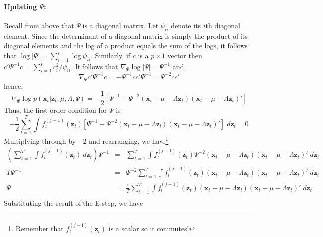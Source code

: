 \paragraph{Updating $\Psi$:} Recall from above that $\Psi$ is a diagonal matrix. Let $\psi_{ii}$ denote its $i$th diagonal element. Since the determinant of a diagonal matrix is simply the product of its diagonal elements and the log of a product equals the sum of the logs, it follows that $\log |\Psi| = \sum_{i=1}^p \log \psi_{ii}$. Similarly, if $c$ is a $p\times 1$ vector then $c' \Psi^{-1} c = \sum_{i=1}^p c_i^2/\psi_{ii}$. It follows that $\nabla_\Psi \log |\Psi| = \Psi^{-1}$ and
	$$\nabla_\Psi c' \Psi^{-1} c = - \Psi^{-1} cc' \Psi^{-1} = \Psi^{-2} cc'$$
hence, 
	$$ \nabla_\Psi \log p(\textbf{x}_t| \textbf{z}_t;\mu, \Lambda, \Psi) = -\frac{1}{2} \left[ \Psi^{-1} - \Psi^{-2}(\mathbf{x}_t - \mu -  \Lambda \textbf{z}_t)(\mathbf{x}_t - \mu -  \Lambda \textbf{z}_t)' \right]$$
Thus, the first order condition for $\Psi$ is
$$-\frac{1}{2}\sum_{t=1}^T \int f_t^{(j-1)}(\textbf{z}_t)  \left[ \Psi^{-1} - \Psi^{-2}(\mathbf{x}_t - \mu -  \Lambda \textbf{z}_t)(\mathbf{x}_t - \mu -  \Lambda \textbf{z}_t)' \right]\;d \textbf{z}_t = 0$$
Multiplying through by $-2$ and rearranging, we have\footnote{Remember that $f_t^{(j-1)}(\textbf{z}_t)$ is a scalar so it commutes!}
\begin{eqnarray*}
	\left(\sum_{t=1}^T \int f_t^{(j-1)}(\textbf{z}_t) \;d \textbf{z}_t\right) \Psi^{-1}&=& \sum_{t=1}^T \int f_t^{(j-1)}(\textbf{z}_t)\Psi^{-2}(\mathbf{x}_t - \mu -  \Lambda \textbf{z}_t)(\mathbf{x}_t - \mu -  \Lambda \textbf{z}_t)' \;d \textbf{z}_t\\
	T\Psi^{-1}&=& \Psi^{-2}\sum_{t=1}^T \int f_t^{(j-1)}(\textbf{z}_t)(\mathbf{x}_t - \mu -  \Lambda \textbf{z}_t)(\mathbf{x}_t - \mu -  \Lambda \textbf{z}_t)' \;d \textbf{z}_t\\
	\Psi &=& \frac{1}{T}\sum_{t=1}^T \int f_t^{(j-1)}(\textbf{z}_t)(\mathbf{x}_t - \mu -  \Lambda \textbf{z}_t)(\mathbf{x}_t - \mu -  \Lambda \textbf{z}_t)' \;d \textbf{z}_t\\
\end{eqnarray*}
Substituting the result of the E-step, we have
